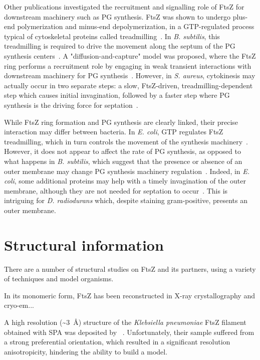 Other publications investigated the recruitment and signalling role of FtsZ for downstream machinery such as PG synthesis.
FtsZ was shown to undergo plus-end polymerization and minus-end depolymerization, in a GTP-regulated process typical of cytoskeletal proteins called treadmilling~\cite{looseBacterialCellDivision2014}.
In \textit{B. subtilis}, this treadmilling is required to drive the movement along the septum of the PG synthesis centers~\cite{bisson-filhoTreadmillingFtsZFilaments2017}.
A "diffusion-and-capture" model was proposed, where the FtsZ ring performs a recruitment role by engaging in weak transient interactions with downstream machinery for PG synthesis~\cite{baranovaDiffusionCapturePermits2020}.
However, in \textit{S. aureus}, cytokinesis may actually occur in two separate steps: a slow, FtsZ-driven, treadmilling-dependent step which causes initial invagination, followed by a faster step where PG synthesis is the driving force for septation~\cite{monteiroPeptidoglycanSynthesisDrives2018}.

While FtsZ ring formation and PG synthesis are clearly linked, their precise interaction may differ between bacteria.
In \textit{E. coli}, GTP regulates FtsZ treadmilling, which in turn controls the movement of the synthesis machinery~\cite{yangGTPaseActivityCoupled2017}.
However, it does not appear to affect the rate of PG synthesis, as opposed to what happens in \textit{B. subtilis}, which suggest that the presence or absence of an outer membrane may change PG synthesis machinery regulation~\cite{yangGTPaseActivityCoupled2017}.
Indeed, in \textit{E. coli}, some additional proteins may help with a timely invagination of the outer membrane, although they are not needed for septation to occur~\cite{gerdingTransenvelopeTolPal2007}.
This is intriguing for \textit{D. radiodurans} which, despite staining gram-positive, presents an outer membrane.

\section{Structural information}

There are a number of structural studies on FtsZ and its partners, using a variety of techniques and model organisms.

In its monomeric form, FtsZ has been reconstructed in X-ray crystallography and cryo-em...

A high resolution (\sim\qty{3}{\angstrom}) structure of the \textit{Klebsiella pneumoniae} FtsZ filament obtained with SPA was deposited by ~\citet{fujitaStructuresFtsZSingle2023}.
Unfortunately, their sample suffered from a strong preferential orientation, which resulted in a significant resolution anisotropicity, hindering the ability to build a model.

